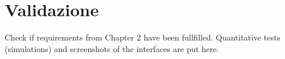 \chapter{Validazione}

Check if requirements from Chapter 2 have been fullfilled. Quantitative tests (simulations) and screenshots of the interfaces are put here.